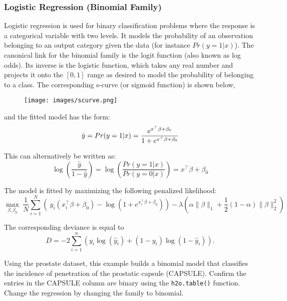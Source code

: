 \subsubsection{Logistic Regression (Binomial Family)}
Logistic regression is used for binary classification problems where the response is a categorical variable with two
levels. It models the probability of an observation belonging to an output category given the data (for instance $ Pr(y = 1|x)$).
The canonical link for the binomial family is the logit function (also known as log odds). Its inverse is the logistic function, which takes any real number and projects it onto the $[0,1]$ range as desired to model the probability of belonging to a class. The corresponding s-curve (or sigmoid function) is shown below,

\begin{figure}[h]
\centering
\texttt{[image: images/scurve.png]}
\end{figure}

and the fitted model has the form:
$$ \hat{y} = Pr(y = 1|x) = {e^{x^{\top}\beta + \beta_0} \over 1 + e^{x^{\top} \beta + \beta_0} }$$

This can alternatively be written as: 
$$  \log \left( \frac{\hat{y}}{ 1- \hat{y} } \right)  = \log \left(  \frac{Pr(y=1|x)}{Pr(y=0|x)}   \right) = x^{\top} \beta + \beta_0$$

The model is fitted by maximizing the following penalized likelihood: 
$$  \max_{\beta,\beta_0} \  \frac{1}{N} \sum_{i=1}^{N} \left( \ y_i (x_i^{\top}\beta  + \beta_0) - \log (1 + e^{x_i^{\top}\beta  + \beta_0} ) \right)  - \lambda \left( \alpha \|\beta \|_1 +  \frac{1}{2}(1- \alpha)  \| \beta \|_2^2 \right)$$

The corresponding deviance is equal to 
$$D = -2\sum_{i=1}^{n} \left(y_i \log(\hat{y}_i) + (1 - y_i)\log(1-\hat{y}_i)  \right).$$

Using the prostate dataset, this example builds a binomial model that classifies the incidence of penetration of the prostatic
capsule (CAPSULE). Confirm the entries in the CAPSULE column are binary using the \texttt{h2o.table()}
function. Change the regression by changing the family to binomial.

\waterExampleInR


\waterExampleInPython



